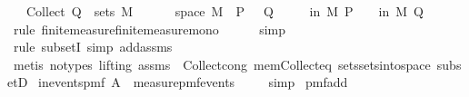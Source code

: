 \begin{isabellebody}
\ \ \ {\isachardoublequoteopen}Collect\ Q\ {\isasymin}\ sets\ M{\isachardoublequoteclose}\isanewline
\ \ \ {\isachardoublequoteopen}{\isasymAnd}{\isasymomega}{\isachardot}{\kern0pt}\ {\isasymomega}\ {\isasymin}\ space\ M\ {\isasymLongrightarrow}\ P\ {\isasymomega}\ {\isasymLongrightarrow}\ Q\ {\isasymomega}{\isachardoublequoteclose}\isanewline
\ \ \ {\isachardoublequoteopen}{\isasymP}{\isacharparenleft}{\kern0pt}{\isasymomega}\ in\ M{\isachardot}{\kern0pt}\ P\ {\isasymomega}{\isacharparenright}{\kern0pt}\ {\isasymle}\ {\isasymP}{\isacharparenleft}{\kern0pt}{\isasymomega}\ in\ M{\isachardot}{\kern0pt}\ Q\ {\isasymomega}{\isacharparenright}{\kern0pt}{\isachardoublequoteclose}\isanewline
%
\isadelimproof
\ \ %
\endisadelimproof
%
\isatagproof
{}\isamarkupfalse%
\ {\isacharparenleft}{\kern0pt}rule\ finite{\isacharunderscore}{\kern0pt}measure{\isachardot}{\kern0pt}finite{\isacharunderscore}{\kern0pt}measure{\isacharunderscore}{\kern0pt}mono{\isacharparenright}{\kern0pt}\isanewline
\ \ \ \ \isamarkupfalse%
\ simp\isanewline
\ \ \isamarkupfalse%
\ {\isacharparenleft}{\kern0pt}rule\ subsetI{\isacharcomma}{\kern0pt}\ simp\ add{\isacharcolon}{\kern0pt}assms{\isacharparenleft}{\kern0pt}{}{\isacharparenright}{\kern0pt}{\isacharparenright}{\kern0pt}\isanewline
\ \ \isamarkupfalse%
\ {\isacharparenleft}{\kern0pt}metis\ {\isacharparenleft}{\kern0pt}no{\isacharunderscore}{\kern0pt}types{\isacharcomma}{\kern0pt}\ lifting{\isacharparenright}{\kern0pt}\ assms{\isacharparenleft}{\kern0pt}{}{\isacharparenright}{\kern0pt}\ \ Collect{\isacharunderscore}{\kern0pt}cong\ mem{\isacharunderscore}{\kern0pt}Collect{\isacharunderscore}{\kern0pt}eq\ sets{\isachardot}{\kern0pt}sets{\isacharunderscore}{\kern0pt}into{\isacharunderscore}{\kern0pt}space\ subsetD{\isacharparenright}{\kern0pt}%
\endisatagproof
{\isafoldproof}%
%
\isadelimproof
\isanewline
%
\endisadelimproof
\isanewline
{}\isamarkupfalse%
\ in{\isacharunderscore}{\kern0pt}events{\isacharunderscore}{\kern0pt}pmf{\isacharcolon}{\kern0pt}\ {\isachardoublequoteopen}A\ {\isasymin}\ measure{\isacharunderscore}{\kern0pt}pmf{\isachardot}{\kern0pt}events\ {\isasymOmega}{\isachardoublequoteclose}\isanewline
%
\isadelimproof
\ \ %
\endisadelimproof
%
\isatagproof
{}\isamarkupfalse%
\ simp%
\endisatagproof
{\isafoldproof}%
%
\isadelimproof
\isanewline
%
\endisadelimproof
\isanewline
{}\isamarkupfalse%
\ pmf{\isacharunderscore}{\kern0pt}add{\isacharcolon}{\kern0pt}\isanewline

\end{isabellebody}
